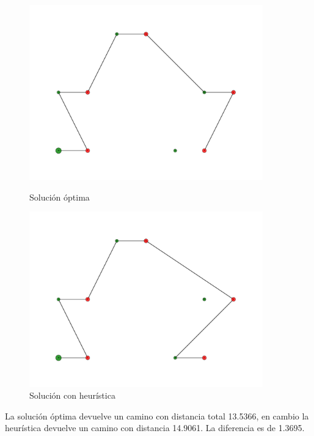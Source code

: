 \begin{figure}[H]
\centering
\begin{minipage}{0.45\textwidth}
\centering
\includegraphics[width=0.9\textwidth]{imagenes/test2-soltest2BT.pdf}
\caption{Solución óptima}
\label{fig:ej2_caso2bt}
\end{minipage}
\qquad
\begin{minipage}{0.45\textwidth}
\centering
\includegraphics[width=0.9\textwidth]{imagenes/test2-soltest2H.pdf}
\caption{Solución con heurística}
\label{fig:ej2_caso2h}
\end{minipage}
\end{figure}

La solución óptima devuelve un camino con distancia total 13.5366, en cambio la heurística devuelve un camino con distancia 14.9061. La diferencia es de 1.3695.



